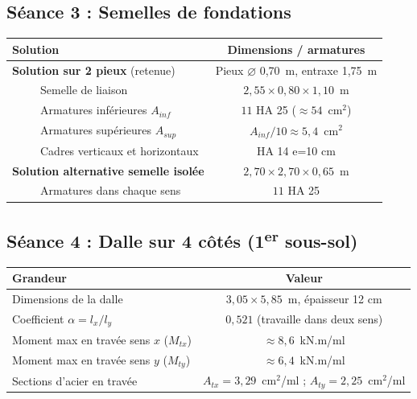 \subsection*{Séance 3 : Semelles de fondations}

\begin{tabularx}{\linewidth}{Xc}
\toprule
\textbf{Solution} & \textbf{Dimensions / armatures} \\
\midrule
\textbf{Solution sur 2 pieux} (retenue)        & Pieux $\varnothing$ 0{,}70~m, entraxe 1{,}75~m \\
~~~~~Semelle de liaison                       & $2{,}55 \times 0{,}80 \times 1{,}10$~m \\
~~~~~Armatures inférieures $A_{inf}$           & $11$ HA 25 ($\approx 54$~cm$^{2}$) \\
~~~~~Armatures supérieures $A_{sup}$           & $A_{inf}/10 \approx 5{,}4$~cm$^{2}$ \\
~~~~~Cadres verticaux et horizontaux           & HA 14 e=10 cm \\
\textbf{Solution alternative semelle isolée} & $2{,}70 \times 2{,}70 \times 0{,}65$~m \\
~~~~~Armatures dans chaque sens                & $11$ HA 25 \\
\bottomrule
\end{tabularx}

\subsection*{Séance 4 : Dalle sur 4 côtés (1\textsuperscript{er} sous-sol)}

\begin{tabularx}{\linewidth}{Xc}
\toprule
\textbf{Grandeur} & \textbf{Valeur} \\
\midrule
Dimensions de la dalle                          & $3{,}05 \times 5{,}85$~m, épaisseur 12 cm \\
Coefficient $\alpha = l_x/l_y$                  & $0{,}521$ (travaille dans deux sens) \\
Moment max en travée sens $x$ ($M_{tx}$)        & $\approx 8{,}6$~kN.m/ml \\
Moment max en travée sens $y$ ($M_{ty}$)        & $\approx 6{,}4$~kN.m/ml \\
Sections d'acier en travée                       & $A_{tx} = 3{,}29$~cm$^{2}$/ml ; $A_{ty} = 2{,}25$~cm$^{2}$/ml \\
\bottomrule
\end{tabularx}


